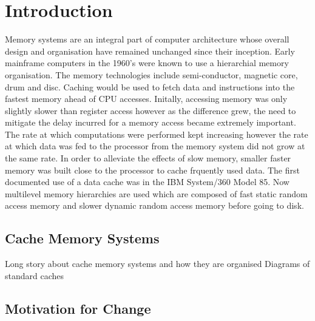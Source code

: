 
%
%

\chapter{Introduction}
\label{introduction}

Memory systems are an integral part of computer architecture whose overall design and organisation have remained unchanged since their inception. Early mainframe computers in the 1960's were known to use a hierarchial memory organisation. The memory technologies include semi-conductor, magnetic core, drum and disc. Caching would be used to fetch data and instructions into the fastest memory ahead of CPU accesses. Initally, accessing memory was only slightly slower than register access however as the difference grew, the need to mitigate the delay incurred for a memory access became extremely important. The rate at which computations were performed kept increasing however the rate at which data was fed to the processor from the memory system did not grow at the same rate. In order to alleviate the effects of slow memory, smaller faster memory was built close to the processor to cache frquently used data. The first documented use of a data cache was in the IBM System/360 Model 85\cite{liptay68}. Now multilevel memory hierarchies are used which are composed of fast static random access memory and slower dynamic random access memory before going to disk.


\section{Cache Memory Systems}

Long story about cache memory systems and how they are organised
Diagrams of standard caches

\section{Motivation for Change}

